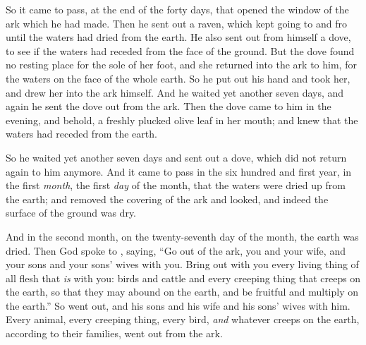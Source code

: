 \bverse So it came to pass, at the end of the forty days, that  opened the window of the ark which he had made.
\bverse Then he sent out a raven, which kept going to and fro until the waters had dried from the earth.
\bverse He also sent out from himself a dove, to see if the waters had receded from the face of the ground.
\bverse But the dove found no resting place for the sole of her foot, and she returned into the ark to him, for the waters \were on the face of the whole earth. So he put out his hand and took her, and drew her into the ark himself.
\bverse And he waited yet another seven days, and again he sent the dove out from the ark.
\bverse Then the dove came to him in the evening, and behold, a freshly plucked olive leaf \was in her mouth; and  knew that the waters had receded from the earth.

\bverse So he waited yet another seven days and sent out a dove, which did not return again to him anymore. 
\bverse And it came to pass in the six hundred and first year, in the first \textit{month}, the first \textit{day} of the month, that the waters were dried up from the earth; and  removed the covering of the ark and looked, and indeed the surface of the ground was dry.
	
\bverse And in the second month, on the twenty-seventh day of the month, the earth was dried.
\bverse Then God spoke to , saying,
\bverse ``Go out of the ark, you and your wife, and your sons and your sons' wives with you.
\bverse Bring out with you every living thing of all flesh that \textit{is} with you: birds and cattle and every creeping thing that creeps on the earth, so that they may abound on the earth, and be fruitful and multiply on the earth.''
\bverse So  went out, and his sons and his wife and his sons' wives with him.
\bverse Every animal, every creeping thing, every bird, \textit{and} whatever creeps on the earth, according to their families, went out from the ark.

